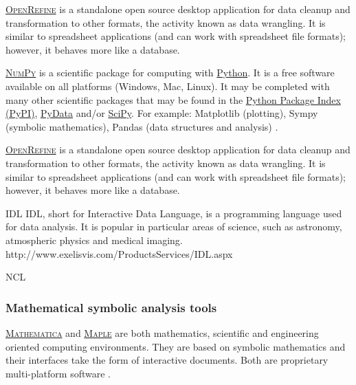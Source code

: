 \vspace{0.4cm}

\noindent {} \textsc{\href{http://openrefine.org}{OpenRefine}} is a standalone open source desktop application for data cleanup and transformation to other formats, the activity known as data wrangling. It is similar to spreadsheet applications (and can work with spreadsheet file formats); however, it behaves more like a database.

\vspace{0.4cm}

\noindent {}  \textsc{\href{http://www.numpy.org}{NumPy}} is a scientific package for computing with \href{http://www.python.org/}{Python}. It is a free software available on all platforms (Windows, Mac, Linux). It may be completed with many other scientific packages that may be found in the \href{https://pypi.python.org/pypi}{Python Package Index (PyPI)}, \href{http://pydata.org/downloads/}{PyData} and/or \href{http://www.scipy.org/}{SciPy}. For example: Matplotlib (plotting), Sympy (symbolic mathematics), Pandas (data structures and analysis) \cite{numpy_numpy_2015,python_software_foundation_python.org_2015,pydata_pydata.org_2015}.

\vspace{0.4cm}

\noindent {} \textsc{\href{http://openrefine.org}{OpenRefine}} is a standalone open source desktop application for data cleanup and transformation to other formats, the activity known as data wrangling. It is similar to spreadsheet applications (and can work with spreadsheet file formats); however, it behaves more like a database.

IDL
IDL, short for Interactive Data Language, is a programming language used for data analysis. It is popular in particular areas of science, such as astronomy, atmospheric physics and medical imaging. 
http://www.exelisvis.com/ProductsServices/IDL.aspx

NCL

\subsubsection{Mathematical symbolic analysis tools}

\noindent {}  \textsc{\href{http://www.wolfram.com/mathematica/}{Mathematica}} and  \textsc{\href{http://www.maplesoft.com/products/maple/}{Maple}} are both mathematics, scientific and engineering oriented computing environments. They are based on symbolic mathematics and their interfaces take the form of interactive documents. Both are proprietary multi-platform software \cite{maplesoft_maple_2015,wolfram_wolfram_2015}.

